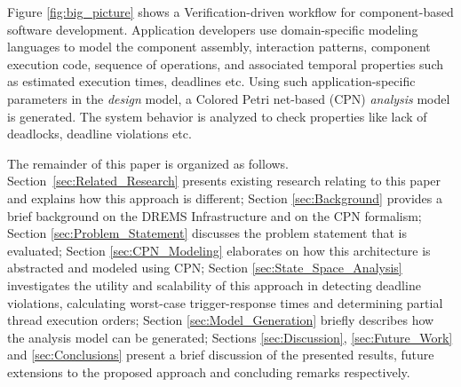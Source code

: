 Figure \ref{fig:big_picture} shows a Verification-driven workflow for component-based software development. Application developers use domain-specific modeling languages to model the component assembly, interaction patterns, component execution code, sequence of operations, and associated temporal properties such as estimated execution times, deadlines etc. Using such application-specific parameters in the \textit{design} model, a Colored Petri net-based (CPN) \cite{CPN} \textit{analysis} model is generated. The system behavior is analyzed to check properties like lack of deadlocks, deadline violations etc. %

The remainder of this paper is organized as follows. Section~\ref{sec:Related_Research} presents existing research relating to this paper and explains how this approach is different; Section \ref{sec:Background} provides a brief background on the DREMS Infrastructure and on the CPN formalism; Section \ref{sec:Problem_Statement} discusses the problem statement that is evaluated; Section \ref{sec:CPN_Modeling} elaborates on how this architecture is abstracted and modeled using CPN; Section \ref{sec:State_Space_Analysis} investigates the utility and scalability of this approach in detecting deadline violations, calculating worst-case trigger-response times and determining partial thread execution orders; Section \ref{sec:Model_Generation} briefly describes how the analysis model can be generated; Sections \ref{sec:Discussion}, \ref{sec:Future_Work} and \ref{sec:Conclusions} present a brief discussion of the presented results, future extensions to the proposed approach and concluding remarks respectively.